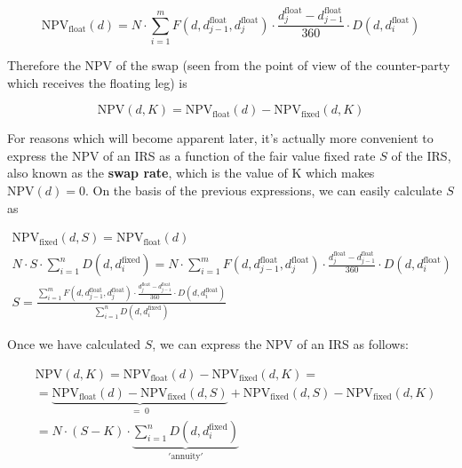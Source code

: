 \begin{equation}\mathrm{NPV}_{\mathrm{float}}(d) = N\cdot\sum_{i=1}^{m}F(d, d_{j-1}^{\mathrm{float}}, d_{j}^{\mathrm{float}}) \cdot \frac{d_{j}^{\mathrm{float}}-d_{j-1}^{\mathrm{float}}}{360}
\cdot D(d, d_{i}^{\mathrm{float}})\end{equation}

Therefore the NPV of the swap (seen from the point of view of the counter-party which receives the floating leg) is

\begin{equation}\mathrm{NPV}(d, K) = \mathrm{NPV}_{\mathrm{float}}(d) - \mathrm{NPV}_{\mathrm{fixed}}(d, K)\end{equation}

For reasons which will become apparent later, it's actually more convenient to express the NPV of an IRS as a function of the fair value fixed rate \(S\) of the IRS, also known as the \textbf{swap rate}, which is the value of K which makes \(\mathrm{NPV}(d)=0\). On the basis of the previous expressions, we can easily calculate \(S\) as

\begin{equation}
\begin{gathered}
\mathrm{NPV}_{\mathrm{fixed}}(d, S) = \mathrm{NPV}_{\mathrm{float}}(d)\\
N\cdot S\cdot\sum_{i=1}^{n}D(d, d_{i}^{\mathrm{fixed}}) = N\cdot\sum_{i=1}^{m}F(d, d_{j-1}^{\mathrm{float}}, d_{j}^{\mathrm{float}}) \cdot \frac{d_{j}^{\mathrm{float}}-d_{j-1}^{\mathrm{float}}}{360} \cdot D(d, d_{i}^{\mathrm{float}})\\
S=\frac{\sum_{i=1}^{m}F(d, d_{j-1}^{\mathrm{float}}, d_{j}^{\mathrm{float}}) \cdot \frac{d_{j}^{\mathrm{float}}-d_{j-1}^{\mathrm{float}}}{360}
\cdot D(d, d_{i}^{\mathrm{float}})}{\sum_{i=1}^{n}D(d, d_i^{\mathrm{fixed}})}
\end{gathered}
\end{equation}

Once we have calculated \(S\), we can express the \(\mathrm{NPV}\) of an IRS as follows:

\begin{equation}
\begin{split}&\mathrm{NPV}(d, K) = \mathrm{NPV}_{\mathrm{float}}(d) - \mathrm{NPV}_{\mathrm{fixed}}(d, K) = \\ 
&= \underbrace{\mathrm{NPV}_{\mathrm{float}}(d) - \mathrm{NPV}_{\mathrm{fixed}}(d, S)}_{\mathrm{=\;0}} + \mathrm{NPV}_{\mathrm{fixed}}(d, S) - \mathrm{NPV}_{\mathrm{fixed}}(d, K) \\ 
& = N\cdot(S-K)\cdot\underbrace{\sum_{i=1}^{n}D(d, d_{i}^{\mathrm{fixed}})}_{\mathrm{'annuity'}}
\end{split}
\end{equation}

